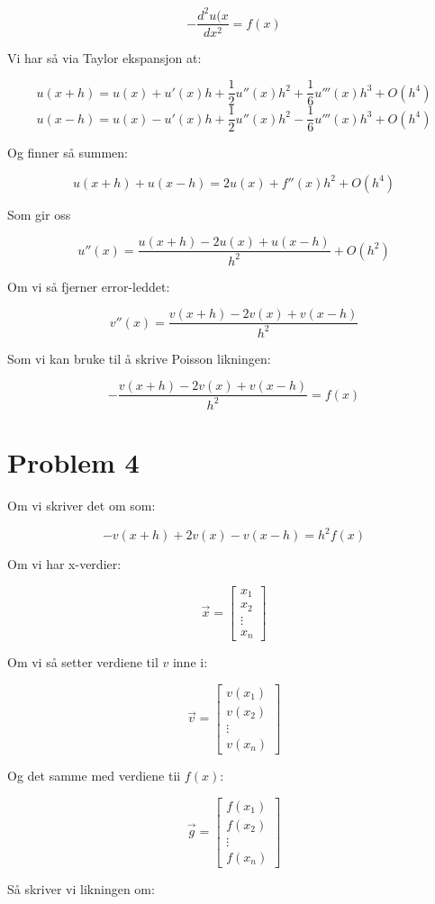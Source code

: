 \documentclass[english,notitlepage]{revtex4-1}  %
\begin{document}
$$ -\frac{d^2 u(x}{dx^2} = f(x)$$

Vi har så via Taylor ekspansjon at:

$$u(x + h) = u(x) + u'(x)h + \frac{1}{2}u''(x)h^2 + \frac{1}{6}u'''(x)h^3 + O(h^4)$$
$$u(x - h) = u(x) - u'(x)h + \frac{1}{2}u''(x)h^2 - \frac{1}{6}u'''(x)h^3 + O(h^4)$$

Og finner så summen:

$$u(x+h)+u(x-h) = 2u(x) + f''(x)h^2 + O(h^4)$$

Som gir oss

$$u''(x) = \frac{u(x+h)-2u(x)+u(x-h)}{h^2} + O(h^2)$$

Om vi så fjerner error-leddet:

$$v''(x) = \frac{v(x+h)-2v(x)+v(x-h)}{h^2}$$

Som vi kan bruke til å skrive Poisson likningen:

$$-\frac{v(x+h)-2v(x)+v(x-h)}{h^2} = f(x)$$

\section*{Problem 4}

Om vi skriver det om som:

$$-v(x+h)+2v(x)-v(x-h) = h^2f(x)$$

Om vi har x-verdier:

$$\vec{x} = \begin{bmatrix}
x_1 \\ x_2 \\ \vdots \\ x_n
\end{bmatrix}$$

Om vi så setter verdiene til $v$ inne i:

$$ \vec{v} = \begin{bmatrix}
v(x_1) \\ v(x_2) \\ \vdots \\ v(x_n)
\end{bmatrix}$$

Og det samme med verdiene tii $f(x)$:

$$\vec{g} = \begin{bmatrix}
f(x_1) \\ f(x_2) \\ \vdots \\ f(x_n)
\end{bmatrix}$$

Så skriver vi likningen om:
\end{document}
